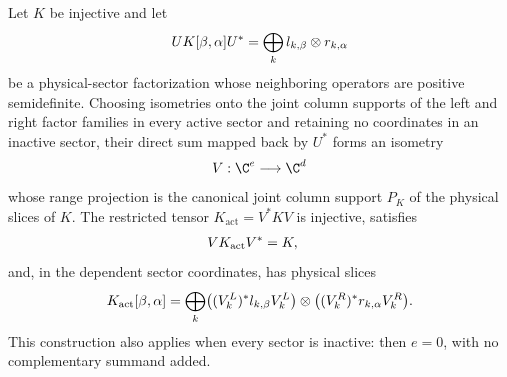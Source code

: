 \begin{lemma}
    \label{thm:mpdo_active_physical_sector_restriction}
    \leanok
    Let $K$ be injective and let
    \begin{align}
        UK[\beta,\alpha]U^*
        =\bigoplus_k l_{k,\beta}\otimes r_{k,\alpha}
        \notag
    \end{align}
    be a physical-sector factorization whose neighboring operators are
    positive semidefinite.  Choosing isometries onto the
    joint column supports of the left and right factor families in every active sector and retaining
    no coordinates in an inactive sector, their direct sum mapped
    back by $U^*$ forms an isometry
    \begin{align}
        V:\C^e\longrightarrow\C^d
        \notag
    \end{align}
    whose range projection is the canonical joint column support
    $P_K$ of the physical slices of $K$.  The restricted tensor
    $K_{\mathrm{act}}=V^*KV$ is injective, satisfies
    \begin{align}
        VK_{\mathrm{act}}V^* & =K,
        \notag
    \end{align}
    and, in the dependent sector coordinates, has physical slices
    \begin{align}
        K_{\mathrm{act}}[\beta,\alpha]
        =\bigoplus_k
        \bigl((V_k^L)^*l_{k,\beta}V_k^L\bigr)
        \otimes
        \bigl((V_k^R)^*r_{k,\alpha}V_k^R\bigr).
        \notag
    \end{align}
    This construction also applies when every sector is inactive: then
    $e=0$, with no complementary summand added.
\end{lemma}


